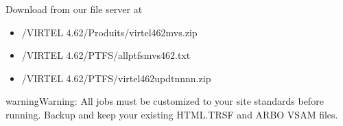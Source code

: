 \documentclass[letterpaper,10pt,english]{sphinxmanual}
\begin{document}
\sphinxAtStartPar
Download from our file server at 
\begin{itemize}
\item {} 
\sphinxAtStartPar
/VIRTEL 4.62/Produits/virtel462mvs.zip

\item {} 
\sphinxAtStartPar
/VIRTEL 4.62/PTFS/allptfs\sphinxhyphen{}mvs462.txt

\item {} 
\sphinxAtStartPar
/VIRTEL 4.62/PTFS/virtel462updtnnnn.zip

\end{itemize}

\begin{sphinxadmonition}{warning}{Warning:}
\sphinxAtStartPar
All jobs must be customized to your site standards before running. Backup and keep your existing HTML.TRSF and ARBO VSAM files.
\end{sphinxadmonition}
\end{document}
